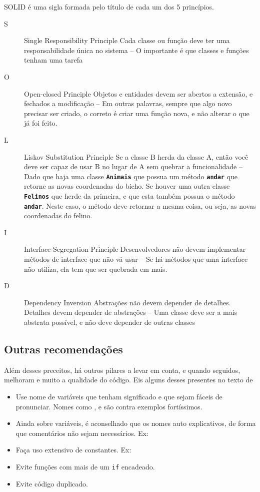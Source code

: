 SOLID é uma sigla formada pelo título de cada um dos 5 princípios.
\begin{description}
    \item[S] Single Responsibility Principle \dir Cada classe ou função deve ter uma responsabilidade única no
    sistema -- O importante é que classes e funções tenham uma tarefa
    \item[O] Open-closed Principle \dir Objetos e entidades devem ser abertos a extensão, e fechados a modificação
    -- Em outras palavras, sempre que algo novo precisar ser criado, o correto é criar uma função nova, e não
    alterar o que já foi feito.
    \item[L] Liskov Substitution Principle \dir Se a classe B herda da classe A, então você deve ser capaz de usar
    B no lugar de A sem quebrar a funcionalidade -- Dado que haja uma classe \textbf{\texttt{Animais}} que possua
    um método \textbf{\texttt{andar}} que retorne as novas coordenadas do bicho. Se houver uma outra classe
    \textbf{\texttt{Felinos}} que herde da primeira, e que esta também possua o método \textbf{\texttt{andar}}.
    Neste caso, o método deve retornar a mesma coisa, ou seja, as novas coordenadas do felino.
    \item[I] Interface Segregation Principle \dir Desenvolvedores não devem implementar métodos de interface que
    não vá usar -- Se há métodos que uma interface não utiliza, ela tem que ser quebrada em mais.
    \item[D] Dependency Inversion \dir Abstrações não devem depender de detalhes. Detalhes devem depender de
    abstrações -- Uma classe deve ser a mais abstrata possível, e não deve depender de outras classes
\end{description}


\subsection{Outras recomendações}\label{subsec:recomendacoes}

Além desses preceitos, há outros pilares a levar em conta, e quando seguidos, melhoram e muito a qualidade do
código.
Eis alguns desses presentes no texto de \cite{BP}
\begin{itemize}
    \item Use nome de variáveis que tenham significado e que sejam fáceis de pronunciar. Nomes como \texttt{},
    \texttt{} e \texttt{} são contra exemplos fortíssimos.
    \item Ainda sobre variáveis, é aconselhado que os nomes auto explicativos, de forma que comentários não sejam
    necessários. Ex: \texttt{} \dir \texttt{}
    \item Faça uso extensivo de constantes. Ex: \texttt{} \dir \texttt{}
    \item Evite funções com mais de um \texttt{if} encadeado.
    \item Evite código duplicado.
\end{itemize}

